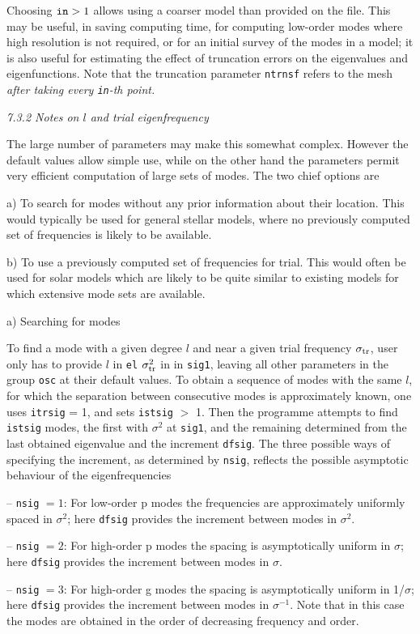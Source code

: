 Choosing ${\tt in} > 1$ allows using a coarser model than 
provided on the file. 
This may be useful, in saving computing time,
for computing low-order modes where high resolution is not required,
or for an initial survey of the modes in a model;
it is also useful for estimating the effect of truncation
errors on the eigenvalues and eigenfunctions.
Note that the truncation parameter {\tt ntrnsf} refers to the mesh
{\it after taking every {\tt in}-th point.}

\subsect
{\it 7.3.2 Notes on $l$ and trial eigenfrequency}

The large number of parameters may make this somewhat complex. However
the default values allow simple use, while on the other hand the parameters
permit very efficient computation of large sets of modes.
The two chief options are 
\medskip
\item {a)} To search for modes without any prior information about
their location.
This would typically be used for general stellar models, where
no previously computed set of frequencies is likely to be available.

\item{b)} To use a previously computed set of frequencies for trial.
This would often be used for solar models which are likely to be quite
similar to existing models for which extensive mode sets are 
available.

\subsect
{a) Searching for modes}

To find a mode with a given degree $l$ and near a given trial frequency
$\sigma_{\rm tr}$,
user only has to provide $l$ in {\tt el} $\sigma_{\rm tr}^2$ in
in {\tt sig1},
leaving all other parameters in the group {\tt osc}
at their default values.
To obtain a sequence of modes with the same $l$, for which the separation
between consecutive modes is approximately known,
one uses {\tt itrsig} = 1, and sets {\tt istsig} $>$ 1.
Then the programme attempts to find {\tt istsig} modes, the first with
$\sigma^2$ at {\tt sig1}, and the remaining determined from the last
obtained eigenvalue and the increment {\tt dfsig}.
The three possible 
ways of specifying the increment, as
determined by {\tt nsig}, reflects the
possible asymptotic behaviour of the eigenfrequencies
\medskip
\item{--} {\tt nsig} $ = 1$:
For low-order
p modes the frequencies are approximately uniformly spaced in $\sigma^2$;
here {\tt dfsig} provides the increment between modes in $\sigma^2$.
\item{--} {\tt nsig} $ = 2$:
For high-order p modes the spacing is asymptotically uniform in $\sigma$;
here {\tt dfsig} provides the increment between modes in $\sigma$.
\item{--} {\tt nsig} $ = 3$:
For high-order g modes
the spacing is asymptotically uniform in 1/$\sigma$;
here {\tt dfsig} provides the increment between modes in $\sigma^{-1}$.
Note that in this case the modes are obtained in the order of decreasing
frequency and order.
\medskip

